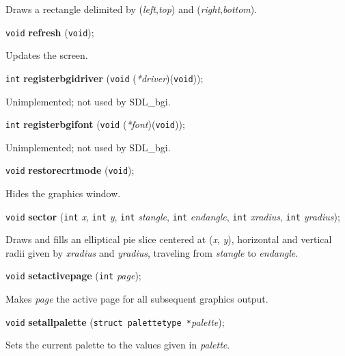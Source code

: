 \documentclass[a4paper,11pt]{article}
\newcommand{\SDLbgi}{SDL\_bgi}
\newcommand{\V}{\texttt{void}}      %
\newcommand{\I}{\texttt{int}}       %
\newcommand{\func}[1]{\textbf{#1}}  %
\newcommand{\A}[1]{\emph{#1}}       %
\newenvironment{bgi}
{ %
  \begin{snugshade}
}
{ %
  \end{snugshade}
}
\begin{document}
Draws a rectangle delimited by (\A{left},\A{top}) and
(\A{right},\A{bottom}).


\begin{bgi}
\V{} \func{refresh} (\V{});
\end{bgi}

Updates the screen.


\begin{bgi}
\I{} \func{registerbgidriver} (\V{} (\A{*driver})(\V{})); 
\end{bgi}

Unimplemented; not used by \SDLbgi.


\begin{bgi}
\I{} \func{registerbgifont} (\V{} (\A{*font})(\V{})); 
\end{bgi}

Unimplemented; not used by \SDLbgi.


\begin{bgi}
\V{} \func{restorecrtmode} (\V{}); 
\end{bgi}

Hides the graphics window.


\begin{bgi}
\V{} \func{sector} (\I{} \A{x}, \I{} \A{y}, \I{} \A{stangle}, \I{}
\A{endangle}, \I{} \A{xradius}, \I{} \A{yradius});
\end{bgi}

Draws and fills an elliptical pie slice centered at (\A{x}, \A{y}),
horizontal and vertical radii given by \A{xradius} and \A{yradius},
traveling from \A{stangle} to \A{endangle}.


\begin{bgi}
\V{} \func{setactivepage} (\I{} \A{page});
\end{bgi}

Makes \A{page} the active page for all subsequent graphics output.


\begin{bgi}
\V{} \func{setallpalette} (\texttt{struct palettetype *}\A{palette}); 
\end{bgi}

Sets the current palette to the values given in \A{palette}.

\end{document}

